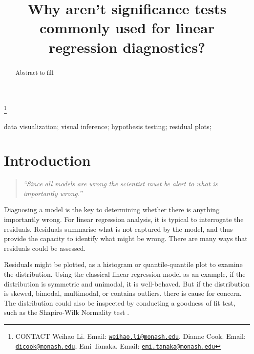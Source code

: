 \documentclass[]{interact}
\theoremstyle{plain}%
\theoremstyle{definition}
\theoremstyle{remark}
\begin{document}

\title{Why aren't significance tests commonly used for linear regression
diagnostics?}


\author{
}

\thanks{CONTACT Weihao
Li. Email: \href{mailto:weihao.li@monash.edu}{\nolinkurl{weihao.li@monash.edu}}, Dianne
Cook. Email: \href{mailto:dicook@monash.edu}{\nolinkurl{dicook@monash.edu}}, Emi
Tanaka. Email: \href{mailto:emi.tanaka@monash.edu}{\nolinkurl{emi.tanaka@monash.edu}}}

\maketitle

\begin{abstract}
Abstract to fill.
\end{abstract}

\begin{keywords}
data visualization; visual inference; hypothesis testing; residual
plots;
\end{keywords}

\hypertarget{introduction}{%
\section{Introduction}\label{introduction}}

\begin{quote}
\emph{``Since all models are wrong the scientist must be alert to what
is importantly wrong.''} \citep{box1976science}
\end{quote}

Diagnosing a model is the key to determining whether there is anything
importantly wrong. For linear regression analysis, it is typical to
interrogate the residuals. Residuals summarise what is not captured by
the model, and thus provide the capacity to identify what might be
wrong. There are many ways that residuals could be assessed.

Residuals might be plotted, as a histogram or quantile-quantile plot to
examine the distribution. Using the classical linear regression model as
an example, if the distribution is symmetric and unimodal, it is
well-behaved. But if the distribution is skewed, bimodal, multimodal, or
contains outliers, there is cause for concern. The distribution could
also be inspected by conducting a goodness of fit test, such as the
Shapiro-Wilk Normality test \citep{shapiro1965analysis}.
\end{document}
